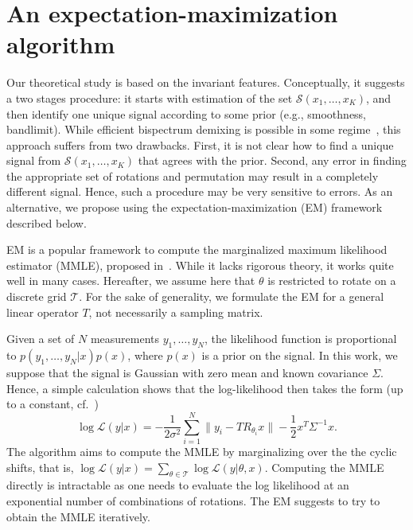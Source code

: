 \documentclass[english,12pt]{article}
\newcommand{\TODO}[1]{{\color{red}{[#1]}}}
\numberwithin{equation}{section}
\numberwithin{thm}{section} %
\begin{document}
\section{An expectation-maximization algorithm }
\label{sec:EM}

Our theoretical study is based on the invariant features. Conceptually, it suggests a two stages procedure: it starts with estimation of the set $\mathcal{S}(x_1,\ldots,x_K)$, and then identify one unique signal according to some prior (e.g., smoothness, bandlimit).
While efficient bispectrum demixing is possible in some regime~\cite{boumal2018heterogeneous,weinthesis}, this approach suffers from two drawbacks. First, it is not clear how to find a unique signal from $\mathcal{S}(x_1,\ldots,x_K)$ that agrees with the prior.  Second, any error in finding the appropriate set of rotations and permutation may result in a  completely different signal. Hence, such a procedure may be very sensitive to errors. 
As an alternative, we propose using the expectation-maximization (EM) framework described below. 

EM is a popular  framework to compute the marginalized maximum likelihood estimator (MMLE), proposed in~\cite{dempster1977maximum}. While it lacks rigorous theory, it works quite well in many cases. Hereafter, we assume here that $\theta$ is restricted to rotate on a discrete grid $\mathcal{T}$. For the sake of generality, we formulate the EM for a general linear operator $T$, not necessarily a sampling matrix.

\TODO{To write here the explicit model with a general linear transformation}
Given a set of $N$ measurements $y_1,\ldots,y_N$, the likelihood function  is proportional to $p(y_1,\ldots,y_N|x)p(x)$, where $p(x)$ is a prior on the signal. 
In this work, we suppose that the signal is Gaussian with zero mean and known covariance $\Sigma$.
Hence,  a simple calculation shows that the log-likelihood  then takes the form (up to a constant, cf.~\cite{bendory2017bispectrum,abbe2018multireference})
\begin{equation}
\log \mathcal{L}(y|x)  = -\frac{1}{2\sigma^2}\sum_{i=1}^{N}\|y_i - TR_{\theta_i}x\| - \frac{1}{2}x^T\Sigma^{-1}x.
\end{equation}
The algorithm aims to compute the MMLE by marginalizing over the the cyclic shifts, that is,  $\log \mathcal{L}(y|x)  = \sum_{\theta\in\mathcal{T}}\log \mathcal{L}(y|\theta,x)$. Computing the MMLE directly is intractable as one needs to evaluate the log likelihood at  an exponential number of combinations of rotations. The EM suggests to try to obtain the MMLE iteratively. 
\end{document}
